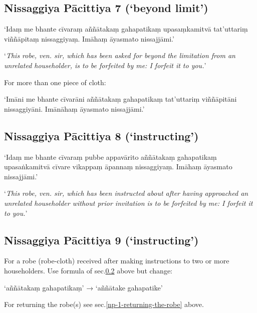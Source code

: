 \subsection{Nissaggiya Pācittiya 7 (‘beyond limit’)}

‘Idaṃ me bhante cīvaraṃ aññātakaṃ gahapatikaṃ upasaṃkamitvā tat'uttariṃ
viññāpitaṃ nissaggiyaṃ. Imāhaṃ āyasmato nissajjāmi.’

‘\emph{This robe, ven. sir, which has been asked for beyond the limitation from
  an unrelated householder, is to be forfeited by me: I forfeit it to you.}’

For more than one piece of cloth:

‘Imāni me bhante cīvarāni aññātakaṃ gahapatikaṃ tat'uttariṃ viññāpitāni
nissaggiyāni. Imānāhaṃ āyasmato nissajjāmi.’


\subsection{Nissaggiya Pācittiya 8 (‘instructing’)}
\label{np-8-instructing}

‘Idaṃ me bhante cīvaraṃ pubbe appavārito aññātakaṃ gahapatikaṃ upasaṅkamitvā
cīvare vikappaṃ āpannaṃ nissaggiyaṃ. Imāhaṃ āyasmato nissajjāmi.’

‘\emph{This robe, ven. sir, which has been instructed about after having
  approached an unrelated householder without prior invitation is to be
  forfeited by me: I forfeit it to you.}’ 


\subsection{Nissaggiya Pācittiya 9 (‘instructing’)}

For a robe (robe-cloth) received after making instructions to two or more
householders. Use formula of sec.\ref{np-8-instructing} above but change:

‘aññātakaṃ gahapatikaṃ’ → ‘aññātake gahapatike’

For returning the robe(s) see sec.\ref{np-1-returning-the-robe} above.

